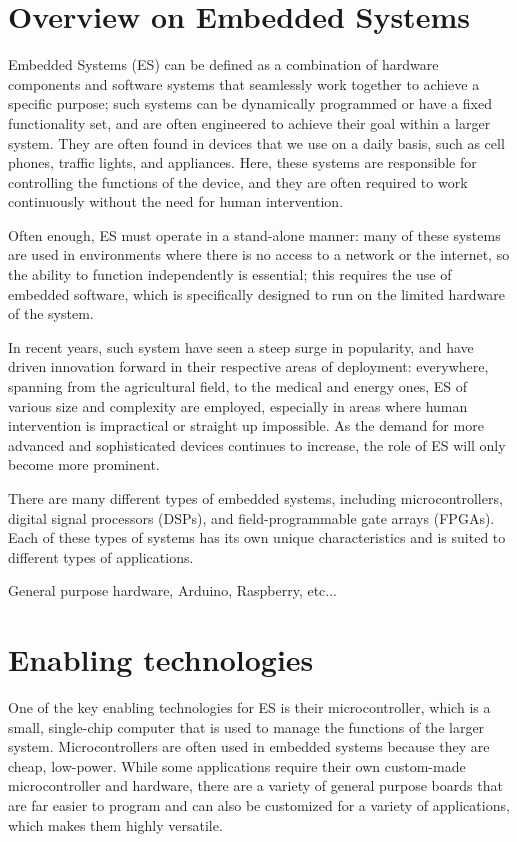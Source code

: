 \section{Overview on Embedded Systems}
Embedded Systems (ES) can be defined as a combination of hardware components and software systems that seamlessly work together to achieve a specific purpose; such systems can be dynamically programmed or have a fixed functionality set, and are often engineered to achieve their goal within a larger system. They are often found in devices that we use on a daily basis, such as cell phones, traffic lights, and appliances. Here, these systems are responsible for controlling the functions of the device, and they are often required to work continuously without the need for human intervention.

Often enough, ES must operate in a stand-alone manner: many of these systems are used in environments where there is no access to a network or the internet, so the ability to function independently is essential; this requires the use of embedded software, which is specifically designed to run on the limited hardware of the system.

In recent years, such system have seen a steep surge in popularity, and have driven innovation forward in their respective areas of deployment: everywhere, spanning from the agricultural field, to the medical and energy ones, ES of various size and complexity are employed, especially in areas where human intervention is impractical or straight up impossible.
As the demand for more advanced and sophisticated devices continues to increase, the role of ES will only become more prominent.

There are many different types of embedded systems, including microcontrollers, digital signal processors (DSPs), and field-programmable gate arrays (FPGAs). Each of these types of systems has its own unique characteristics and is suited to different types of applications.

General purpose hardware, Arduino, Raspberry, etc...



\section{Enabling technologies}
One of the key enabling technologies for ES is their microcontroller, which is a small, single-chip computer that is used to manage the functions of the larger system. Microcontrollers are often used in embedded systems because they are cheap, low-power. While some applications require their own custom-made microcontroller and hardware, there are a variety of  general purpose boards that are far easier to program and can also be customized for a variety of applications, which makes them highly versatile.

